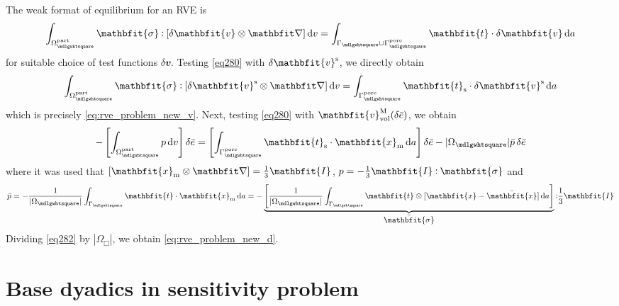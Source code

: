 \documentclass[12pt,review]{elsarticle}
\renewcommand{\ta}[1]{\mathbfit{#1}}
\renewcommand{\ts}[1]{\mathbfit{#1}}
\renewcommand{\Box}{\mdlgwhtsquare}
\newcommand{\pore}{\mathrm{pore}}
\newcommand{\particle}{\mathrm{part}}
\newcommand{\surf}{\mathrm{s}}
\begin{document}
The weak format of equilibrium for an RVE is
\begin{equation}
    \int_{\Omega^\particle_\Box} \ts{\sigma} \dprod \left[\delta \ta{v}\outerp\diff\right] \dif v =
    \int_{\Gamma_\Box\cup\Gamma_\Box^\pore} \ta{t} \cdot \delta\ta{v} \dif a
\label{eq280}
\end{equation}
for suitable choice of test functions $\delta \ta{v}$. Testing \eqref{eq280} with $\delta \ta{v}^\fluct$, we directly obtain
\begin{equation}
    \int_{\Omega^\particle_\Box} \ts{\sigma} \dprod \left[\delta \ta{v}^\fluct\outerp\diff\right] \dif v =
    \int_{\Gamma_\Box^\pore} \ta{t}_\surf \cdot \delta\ta{v}^\fluct \dif a
\label{eq281}
\end{equation}
which is precisely \eqref{eq:rve_problem_new_v}. Next, testing \eqref{eq280} with $\ta{v}^\macro_\vol(\delta\bar{e})$, we obtain
\begin{equation}
    - \left[\int_{\Omega^\particle_\Box} p  \dif v \right]\delta\bar{e} =
    \left[\int_{\Gamma_\Box^\pore} \ta{t}_\surf \cdot \ta{x}_\mean \dif a\right]\delta\bar{e}
    - |\Omega_\Box|\bar{p}\,\delta\bar{e}
\label{eq282}
\end{equation}
where it was used that $[\ta{x}_\mean\outerp\diff]=\frac{1}{3}\ts{I}$, $p=-\frac{1}{3}\ts{I}\dprod\ts{\sigma}$ and
\begin{equation}
    \bar{p} = - \frac{1}{|\Omega_\Box|} \int_{\Gamma_\Box} \ta{t} \cdot \ta{x}_\mean \dif a =
     - \underbrace{\left[\frac{1}{|\Omega_\Box|} \int_{\Gamma_\Box} \ta{t} \outerp [\ta{x}-\bar{\ta{x}}] \dif a\right]}_{\displaystyle\bar{\ts\sigma}}  \dprod \frac{1}{3}\ts{I}
\end{equation}
Dividing \eqref{eq282} by $|\Omega_\Box|$, we obtain \eqref{eq:rve_problem_new_d}.

\section{Base dyadics in sensitivity problem}
\end{document}
